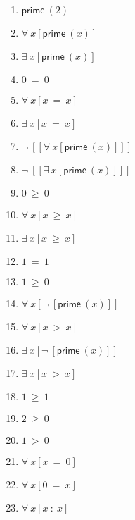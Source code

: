 \documentclass{article}
\begin{document}
\begin{enumerate}

\item $\mathsf{prime} \ (2)$

\item $\forall \ x[\mathsf{prime} \ (x)]$

\item $\exists \ x[\mathsf{prime} \ (x)]$

\item $0 \ = \ 0$

\item $\forall \ x[x \ = \ x]$

\item $\exists \ x[x \ = \ x]$

\item $\neg \ [[\forall \ x[\mathsf{prime} \ (x)]]]$

\item $\neg \ [[\exists \ x[\mathsf{prime} \ (x)]]]$

\item $0 \ \ge \ 0$

\item $\forall \ x[x \ \ge \ x]$

\item $\exists \ x[x \ \ge \ x]$

\item $1 \ = \ 1$

\item $1 \ \ge \ 0$

\item $\forall \ x[\neg \ [\mathsf{prime} \ (x)]]$

\item $\forall \ x[x \ > \ x]$

\item $\exists \ x[\neg \ [\mathsf{prime} \ (x)]]$

\item $\exists \ x[x \ > \ x]$

\item $1 \ \ge \ 1$

\item $2 \ \ge \ 0$

\item $1 \ > \ 0$

\item $\forall \ x[x \ = \ 0]$

\item $\forall \ x[0 \ = \ x]$

\item $\forall \ x[x \ : \ x]$


\end{enumerate}
\end{document}
